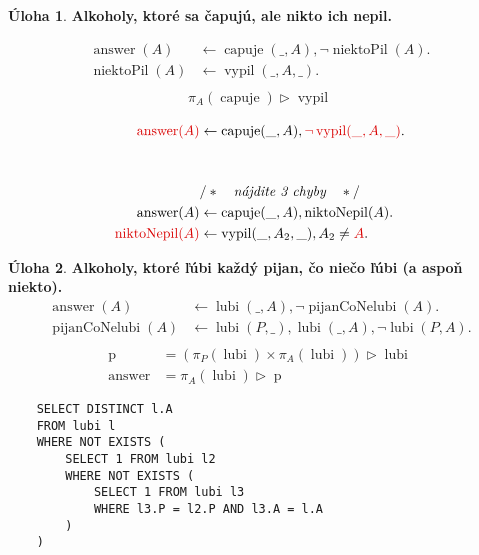\documentclass[10pt, a4paper]{article}
\theoremstyle{definition}
\newtheorem{problem}{Úloha}[section]
\def\beginwrong{\color{red!85!black}}
\def\endwrong{\color{black}}
\DeclareMathOperator{\antijoin}{\rhd}
\DeclareMathOperator{\lubi}{lubi}
\DeclareMathOperator{\capuje}{capuje}
\DeclareMathOperator{\vypil}{vypil}
\DeclareMathOperator{\answer}{answer}
\begin{document}
\begin{problem}
{\bf Alkoholy, ktoré sa čapujú, ale nikto ich nepil.}\\
\begin{minipage}{0.49\textwidth}
\begin{align*}
\answer(A) &\leftarrow \capuje(\_, A), \lnot\operatorname{niektoPil}(A).\\
\operatorname{niektoPil}(A) &\leftarrow \vypil(\_, A, \_).\\
\end{align*}
\begin{align*}
\pi_A(\capuje)\antijoin\vypil
\end{align*}
\end{minipage}
\begin{minipage}{0.49\textwidth}
\begin{align*}
\beginwrong\answer(A)\endwrong &\leftarrow \capuje(\_, A), \beginwrong\lnot\vypil(\_, A, \_)\endwrong.\\[10mm]
& /* \quad \textit{nájdite 3 chyby} \quad */\\
\answer(A) &\leftarrow \capuje(\_, A), \operatorname{niktoNepil}(A).\\
\beginwrong\operatorname{niktoNepil}(A)\endwrong &\leftarrow \vypil(\_, A_2, \_), A_2\neq \beginwrong A\endwrong.
\end{align*}
\end{minipage}
\end{problem}

\begin{problem}
{\bf Alkoholy, ktoré ľúbi každý pijan, čo niečo ľúbi (a aspoň niekto).}
\begin{align*}
\answer(A) &\leftarrow \lubi(\_, A), \lnot\operatorname{pijanCoNelubi}(A).\\
\operatorname{pijanCoNelubi}(A) &\leftarrow \lubi(P, \_), \lubi(\_, A), \lnot\lubi(P, A).\\
\end{align*}
\begin{align*}
\operatorname{p} & = (\pi_P(\lubi) \times \pi_A(\lubi))\antijoin \lubi\\
\answer & = \pi_A(\lubi) \antijoin \operatorname{p}
\end{align*}
\begin{verbatim}
    SELECT DISTINCT l.A
    FROM lubi l
    WHERE NOT EXISTS (
        SELECT 1 FROM lubi l2
        WHERE NOT EXISTS (
            SELECT 1 FROM lubi l3
            WHERE l3.P = l2.P AND l3.A = l.A
        )
    )
\end{verbatim}
\end{problem}
\end{document}
